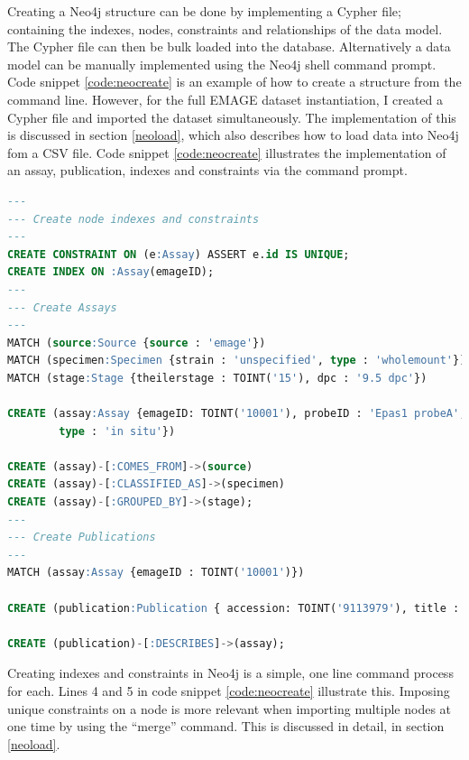 Creating a Neo4j structure can be done by implementing a Cypher file; containing the indexes, nodes, constraints and relationships of the data model. The Cypher file can then be bulk loaded into the database. Alternatively a data model can be manually implemented using the Neo4j shell command prompt. Code snippet \ref{code:neocreate} is an example of how to create a structure from the command line. However, for the full EMAGE dataset instantiation, I created a Cypher file and imported the dataset simultaneously. The implementation of this is discussed in section \ref{neoload}, which also describes how to load data into Neo4j fom a CSV file. Code snippet \ref{code:neocreate} illustrates the implementation of an assay, publication, indexes and constraints via the command prompt.
\newpage
\vspace*{\fill}
\begin{lstlisting}[language=SQL, caption=Example creation of an assay\, publication\, indexes and constraints in Neo4j., label=code:neocreate]
---
--- Create node indexes and constraints
---
CREATE CONSTRAINT ON (e:Assay) ASSERT e.id IS UNIQUE;
CREATE INDEX ON :Assay(emageID);
---
--- Create Assays
---
MATCH (source:Source {source : 'emage'})
MATCH (specimen:Specimen {strain : 'unspecified', type : 'wholemount'})
MATCH (stage:Stage {theilerstage : TOINT('15'), dpc : '9.5 dpc'})

CREATE (assay:Assay {emageID: TOINT('10001'), probeID : 'Epas1 probeA',
		type : 'in situ'})

CREATE (assay)-[:COMES_FROM]->(source)
CREATE (assay)-[:CLASSIFIED_AS]->(specimen)
CREATE (assay)-[:GROUPED_BY]->(stage);
---
--- Create Publications
---
MATCH (assay:Assay {emageID : TOINT('10001')})

CREATE (publication:Publication { accession: TOINT('9113979'), title : 'A novel bHLH-PAS factor with close sequence similarity to hypoxia-inducible factor 1alpha regulates the VEGF expression and is potentially involved in lung and vascular development.', author : 'Ema M, Taya S, Yokotani N, Sogawa K, Matsuda Y, Fujii-Kuriyama Y'})

CREATE (publication)-[:DESCRIBES]->(assay);
\end{lstlisting}
\vspace*{\fill}
\newpage

Creating indexes and constraints in Neo4j is a simple, one line command process for each. Lines 4 and 5 in code snippet \ref{code:neocreate} illustrate this. Imposing unique constraints on a node is more relevant when importing multiple nodes at one time by using the ``merge'' command. This is discussed in detail, in section \ref{neoload}.

